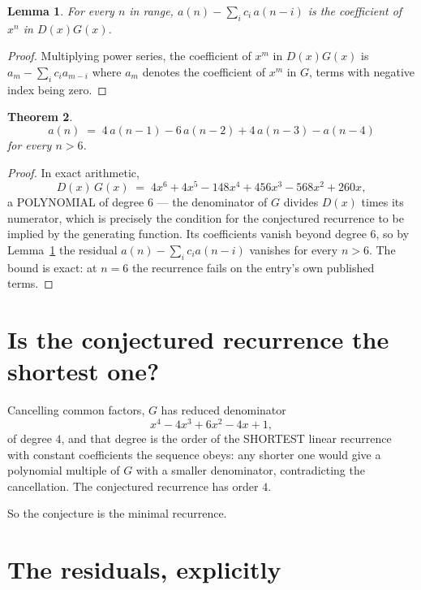 \documentclass[11pt,a4paper]{article}
\theoremstyle{plain}
\newtheorem{theorem}{Theorem}
\newtheorem{lemma}[theorem]{Lemma}
\theoremstyle{definition}
\begin{document}
\begin{lemma}\label{lem:key}
For every $n$ in range, $a(n)-\sum_i c_i\,a(n-i)$ is the coefficient of $x^{n}$ in
$D(x)G(x)$.
\end{lemma}

\begin{proof}
Multiplying power series, the coefficient of $x^{m}$ in $D(x)G(x)$ is
$a_m-\sum_i c_i a_{m-i}$ where $a_m$ denotes the coefficient of $x^{m}$ in $G$, terms with
negative index being zero.
\end{proof}

\begin{theorem}
\[
a(n)\;=\;4\,a(n-1) - 6\,a(n-2) + 4\,a(n-3) - a(n-4)
\]
for every $n>6$.
\end{theorem}

\begin{proof}
In exact arithmetic,
\[
D(x)\,G(x)\;=\;4 x^{6} + 4 x^{5} - 148 x^{4} + 456 x^{3} - 568 x^{2} + 260 x,
\]
a POLYNOMIAL of degree $6$ --- the denominator of $G$ divides $D(x)$ times its numerator,
which is precisely the condition for the conjectured recurrence to be implied by the
generating function. Its coefficients vanish beyond degree $6$, so by
Lemma~\ref{lem:key} the residual $a(n)-\sum_ic_ia(n-i)$ vanishes for every
$n>6$. The bound is exact: at $n=6$ the recurrence fails on the entry's own published terms.
\end{proof}

\section{Is the conjectured recurrence the shortest one?}

Cancelling common factors, $G$ has reduced denominator
\[
x^{4} - 4 x^{3} + 6 x^{2} - 4 x + 1,
\]
of degree $4$, and that degree is the order of the SHORTEST linear recurrence with
constant coefficients the sequence obeys: any shorter one would give a polynomial multiple of
$G$ with a smaller denominator, contradicting the cancellation. The conjectured recurrence has
order $4$.

So the conjecture is the minimal recurrence.

\section{The residuals, explicitly}
\end{document}
